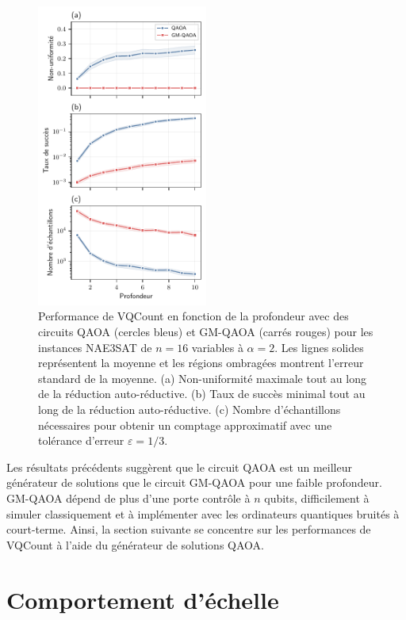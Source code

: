 \begin{figure}[H]
    \centering
    \includegraphics[width=0.5\textwidth]{figures/nae3sat-depth.pdf}
    \caption[Impact de la profondeur du circuit pour \#NAE3SAT]{Performance de VQCount en fonction de la profondeur avec des circuits QAOA (cercles bleus) et GM-QAOA (carrés rouges) pour les instances NAE3SAT de $n=16$ variables à $\alpha=2$. Les lignes solides représentent la moyenne et les régions ombragées montrent l'erreur standard de la moyenne. (a) Non-uniformité maximale tout au long de la réduction auto-réductive. (b) Taux de succès minimal tout au long de la réduction auto-réductive. (c) Nombre d'échantillons nécessaires pour obtenir un comptage approximatif avec une tolérance d'erreur $\varepsilon = 1/3$.}
    \label{fig:nae3sat-depth}
\end{figure}

Les résultats précédents suggèrent que le circuit QAOA est un meilleur générateur de solutions que le circuit GM-QAOA pour une faible profondeur. GM-QAOA dépend de plus d'une porte contrôle à $n$ qubits, difficilement à simuler classiquement et à implémenter avec les ordinateurs quantiques bruités à court-terme. Ainsi, la section suivante se concentre sur les performances de VQCount à l'aide du générateur de solutions QAOA.


\section{Comportement d'échelle}
\label{sec:comportement-echelle}


